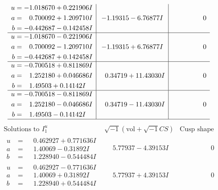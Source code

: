 \documentclass[1p]{elsarticle_modified}
\theoremstyle{definition}
\newcommand{\I}{\sqrt{-1}}
\begin{document}
$$\begin{array}{c|c|c}
\begin{aligned}
u &= -1.018670 + 0.221906 I \\
a &= \phantom{-}0.700092 + 1.209710 I \\
b &= -0.442687 - 0.142458 I\end{aligned}
 & -1.19315 - 6.76877 I & \phantom{-0.000000 } 0 \\ \hline\begin{aligned}
u &= -1.018670 - 0.221906 I \\
a &= \phantom{-}0.700092 - 1.209710 I \\
b &= -0.442687 + 0.142458 I\end{aligned}
 & -1.19315 + 6.76877 I & \phantom{-0.000000 } 0 \\ \hline\begin{aligned}
u &= -0.700518 + 0.811869 I \\
a &= \phantom{-}1.252180 + 0.046686 I \\
b &= \phantom{-}1.49503 + 0.14142 I\end{aligned}
 & \phantom{-}0.34719 + 11.43030 I & \phantom{-0.000000 } 0 \\ \hline\begin{aligned}
u &= -0.700518 - 0.811869 I \\
a &= \phantom{-}1.252180 - 0.046686 I \\
b &= \phantom{-}1.49503 - 0.14142 I\end{aligned}
 & \phantom{-}0.34719 - 11.43030 I & \phantom{-0.000000 } 0\\
 \hline 
 \end{array}$$\newpage$$\begin{array}{c|c|c}  
\text{Solutions to }I^u_{1}& \I (\text{vol} + \sqrt{-1}CS) & \text{Cusp shape}\\
 \hline 
\begin{aligned}
u &= \phantom{-}0.462927 + 0.771636 I \\
a &= \phantom{-}1.40069 - 0.31892 I \\
b &= \phantom{-}1.228940 - 0.544484 I\end{aligned}
 & \phantom{-}5.77937 - 4.39153 I & \phantom{-0.000000 } 0 \\ \hline\begin{aligned}
u &= \phantom{-}0.462927 - 0.771636 I \\
a &= \phantom{-}1.40069 + 0.31892 I \\
b &= \phantom{-}1.228940 + 0.544484 I\end{aligned}
 & \phantom{-}5.77937 + 4.39153 I & \phantom{-0.000000 } 0 \\ \hline\begin{aligned}

\end{aligned}
\end{array}$$
\end{document}
